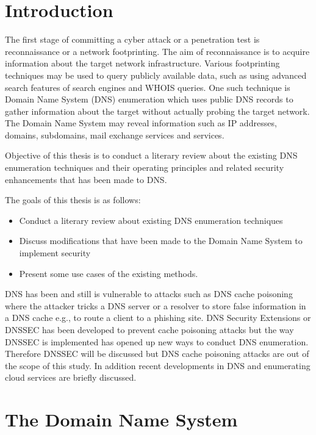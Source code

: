 
\section{Introduction}

The first stage of committing a cyber attack or a penetration test is reconnaissance or a network footprinting. The aim of reconnaissance is to acquire information about the target network infrastructure. Various footprinting techniques may be used to query publicly available data, such as using advanced search features of search engines and WHOIS queries. One such technique is Domain Name System (DNS) enumeration which uses public DNS records to gather information about the target without actually probing the target network. The Domain Name System may reveal information such as IP addresses, domains, subdomains, mail exchange services and services.

Objective of this thesis is to conduct a literary review about the existing DNS enumeration techniques and their operating principles and related security enhancements that has been made to DNS.

The goals of this thesis is as follows:

\begin{itemize}
 \item Conduct a literary review about existing DNS enumeration techniques
 \item Discuss modifications that have been made to the Domain Name System to implement security
 \item Present some use cases of the existing methods.
\end{itemize}

DNS has been and still is vulnerable to attacks such as DNS cache poisoning where the attacker tricks a DNS server or a resolver to store false information in a DNS cache e.g., to route a client to a phishing site. DNS Security Extensions or DNSSEC has been developed to prevent cache poisoning attacks but the way DNSSEC is implemented has opened up new ways to conduct DNS enumeration. Therefore DNSSEC will be discussed but DNS cache poisoning attacks are out of the scope of this study. In addition recent developments in DNS and enumerating cloud services are briefly discussed.


\section{The Domain Name System}

